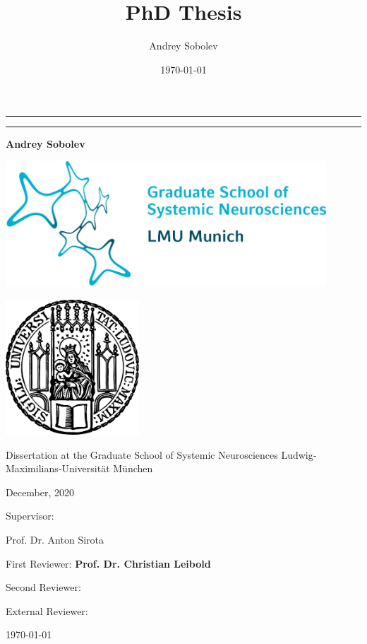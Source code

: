 \documentclass[twoside, 12pt,  footinclude=true, headinclude=true, cleardoublepage=empty]{scrbook}
\title{PhD Thesis}
\author{Andrey Sobolev}
\date{\today}
\begin{document}
\begin{titlepage}
	\centering


    \noindent\rule{15cm}{0.4pt}
    {\linespread{1.5}{\Huge Contribution of the idiothetic and the allothetic information to the hippocampal place code\par}}
    \noindent\rule{15cm}{0.4pt}

	{\LARGE \bfseries Andrey Sobolev}

    \includegraphics[width=120mm]{assets/gsn.jpg}

    \includegraphics[width=50mm]{assets/lmu-logo.png}

    Dissertation at the
    Graduate School of Systemic Neurosciences
    Ludwig‐Maximilians‐Universität München

    December, 2020

    \vfill

	\begin{flushleft}
	{\large Supervisor:}

	{\LARGE Prof. Dr. Anton Sirota\par}

	\vspace{1in}

	{\large First Reviewer:   \bfseries Prof. Dr. Christian Leibold\par}
	{\large Second Reviewer:\par}
	{\large External Reviewer:\par}

    \vspace{1in}
	{\large \today\par}
	\end{flushleft}

\end{titlepage}
\end{document}
